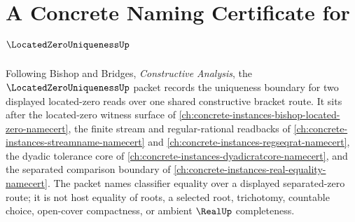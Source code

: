 \chapter{A Concrete Naming Certificate for $\LocatedZeroUniquenessUp$}
\label{ch:concrete-instances-located-zero-uniqueness-namecert}

Following Bishop and Bridges, \emph{Constructive Analysis}, the $\LocatedZeroUniquenessUp$ packet records the uniqueness boundary for two displayed located-zero reads over one shared constructive bracket route. It sits after the located-zero witness surface of \autoref{ch:concrete-instances-bishop-located-zero-namecert}, the finite stream and regular-rational readbacks of \autoref{ch:concrete-instances-streamname-namecert} and \autoref{ch:concrete-instances-regseqrat-namecert}, the dyadic tolerance core of \autoref{ch:concrete-instances-dyadicratcore-namecert}, and the separated comparison boundary of \autoref{ch:concrete-instances-real-equality-namecert}. The packet names classifier equality over a displayed separated-zero route; it is not host equality of roots, a selected root, trichotomy, countable choice, open-cover compactness, or ambient $\RealUp$ completeness.

